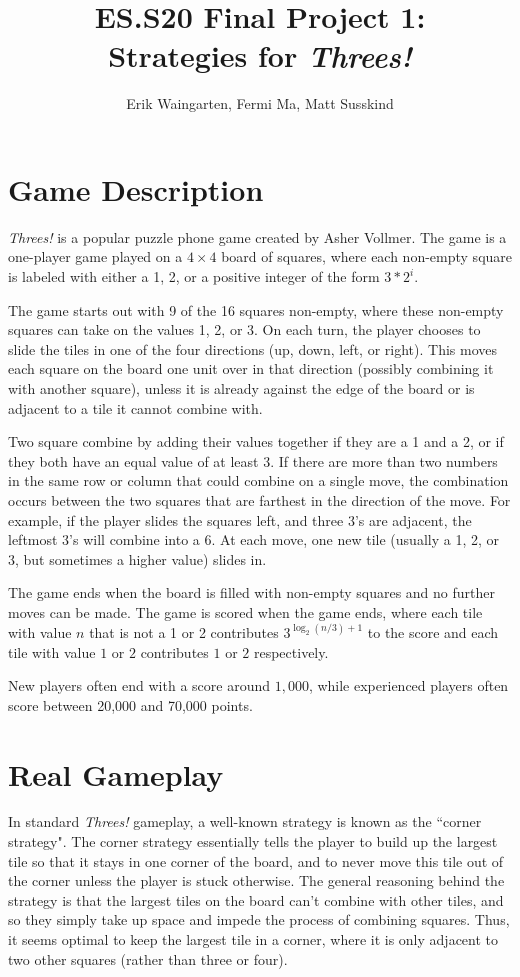 \documentclass[11pt]{article}
\author{Erik Waingarten, Fermi Ma, Matt Susskind}
\title{ES.S20 Final Project 1: \\
Strategies for \emph{Threes!}}
\begin{document}
         
\maketitle

\section{Game Description}


\emph{Threes!} is a popular puzzle phone game created by Asher Vollmer. The game is a one-player game played on a $4 \times 4$ board of squares, where each non-empty square is labeled with either a 1, 2, or a positive integer of the form $3*2^i$.

The game starts out with 9 of the 16 squares non-empty, where these non-empty squares can take on the values 1, 2, or 3. On each turn, the player chooses to slide the tiles in one of the four directions (up, down, left, or right). This moves each square on the board one unit over in that direction (possibly combining it with another square), unless it is already against the edge of the board or is adjacent to a tile it cannot combine with.

Two square combine by adding their values together if they are a 1 and a 2, or if they both have an equal value of at least 3. If there are more than two numbers in the same row or column that could combine on a single move, the combination occurs between the two squares that are farthest in the direction of the move. For example, if the player slides the squares left, and three 3's are adjacent, the leftmost 3's will combine into a 6. At each move, one new tile (usually a 1, 2, or 3, but sometimes a higher value) slides in.

The game ends when the board is filled with non-empty squares and no further moves can be made. The game is scored when the game ends, where each tile with value $n$ that is not a 1 or 2 contributes $3^{\log_2(n/3)+1}$ to the score and each tile with value $1$ or $2$ contributes $1$ or $2$ respectively. 

New players often end with a score around $1,000$, while experienced players often score between 20,000 and 70,000 points.

\section{Real Gameplay}

In standard \emph{Threes!} gameplay, a well-known strategy is known as the ``corner strategy". The corner strategy essentially tells the player to build up the largest tile so that it stays in one corner of the board, and to never move this tile out of the corner unless the player is stuck otherwise. The general reasoning behind the strategy is that the largest tiles on the board can't combine with other tiles, and so they simply take up space and impede the process of combining squares. Thus, it seems optimal to keep the largest tile in a corner, where it is only adjacent to two other squares (rather than three or four).
\end{document}
